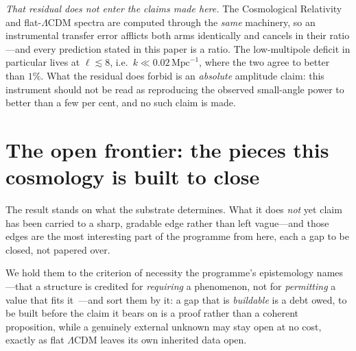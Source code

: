 \documentclass[11pt,a4paper]{article}
\theoremstyle{plain}
\theoremstyle{definition}
\theoremstyle{remark}
\begin{document}
\emph{That residual does not enter the claims made here.} The Cosmological Relativity and flat-$\Lambda$CDM spectra are computed through the \emph{same} machinery, so an instrumental transfer error afflicts both arms identically and cancels in their ratio---and every prediction stated in this paper is a ratio. The low-multipole deficit in particular lives at $\ell\lesssim8$, i.e.\ $k\ll0.02\,\mathrm{Mpc}^{-1}$, where the two agree to better than $1\%$. What the residual does forbid is an \emph{absolute} amplitude claim: this instrument should not be read as reproducing the observed small-angle power to better than a few per cent, and no such claim is made.

\section{The open frontier: the pieces this cosmology is built to close}\label{sec:scope}

The result stands on what the substrate determines. What it does \emph{not} yet claim has been carried to a sharp, gradable edge rather than left vague---and those edges are the most interesting part of the programme from here, each a gap to be closed, not papered over. 

We hold them to the criterion of necessity the programme's epistemology names---that a structure is credited for \emph{requiring} a phenomenon, not for \emph{permitting} a value that fits it~\cite{JanzenShadowExistence}---and sort them by it: a gap that is \emph{buildable} is a debt owed, to be built before the claim it bears on is a proof rather than a coherent proposition, while a genuinely external unknown may stay open at no cost, exactly as flat $\Lambda$CDM leaves its own inherited data open. 
\end{document}
